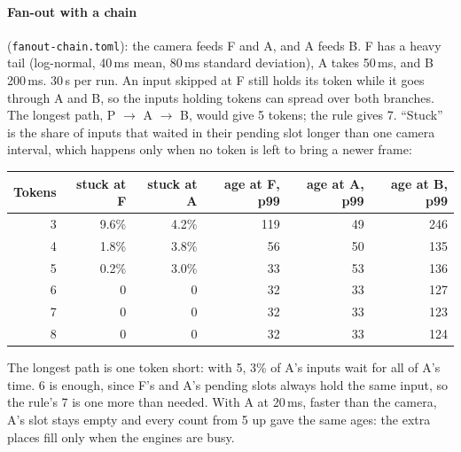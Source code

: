 \documentclass[11pt]{article}
\newcommand{\code}[1]{\texttt{#1}}
\begin{document}
\paragraph{Fan-out with a chain} (\code{fanout-chain.toml}): the camera feeds F and A, and A feeds B. F
has a heavy tail (log-normal, 40\,ms mean, 80\,ms standard deviation), A takes
50\,ms, and B 200\,ms. 30\,s per run. An input skipped at F still holds its
token while it goes through A and B, so the inputs holding tokens can spread
over both branches. The longest path, P $\to$ A $\to$ B, would give 5 tokens;
the rule gives 7. ``Stuck'' is the share of inputs that waited in their
pending slot longer than one camera interval, which happens only when no
token is left to bring a newer frame:
\begin{center}
\small
\begin{tabular}{@{}rrrrrr@{}}
\toprule
Tokens & stuck at F & stuck at A & age at F, p99 & age at A, p99 & age at B, p99 \\
\midrule
3 & 9.6\% & 4.2\% & 119 & 49 & 246 \\
4 & 1.8\% & 3.8\% & 56  & 50 & 135 \\
5 & 0.2\% & 3.0\% & 33  & 53 & 136 \\
6 & 0     & 0     & 32  & 33 & 127 \\
7 & 0     & 0     & 32  & 33 & 123 \\
8 & 0     & 0     & 32  & 33 & 124 \\
\bottomrule
\end{tabular}
\end{center}
The longest path is one token short: with 5, 3\% of A's inputs wait for all
of A's time. 6 is enough, since F's and A's pending slots always hold the
same input, so the rule's 7 is one more than needed. With A at 20\,ms, faster
than the camera, A's slot stays empty and every count from 5 up gave the
same ages: the extra places fill only when the engines are busy.
\end{document}
